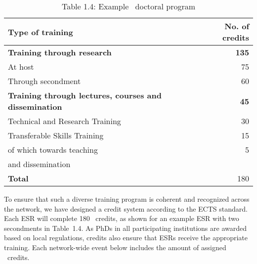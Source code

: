 \begin{wraptable}{l}{0.4\textwidth}
    \vspace{-2mm}
	\caption*{Table 1.4: Example \acronym\ doctoral program\label{tab:docProg}
	}\vspace{4mm}
	\footnotesize
	\begin{tabular}{p{45mm}r}
		\midrule
		Type of training & No. of credits \tabularnewline\midrule
		\textbf{Training through research}  & \textbf{135} \tabularnewline
		\hspace{5mm}At host & 75 \tabularnewline
		\hspace{5mm}Through secondment  & 60 \tabularnewline\midrule
		\textbf{Training through lectures, courses and dissemination} &  \textbf{45} \tabularnewline
		\hspace{5mm}Technical and Research Training & 30 \tabularnewline
		\hspace{5mm}Transferable Skills Training & 15 \tabularnewline
		\hspace{10mm}of which towards teaching & 5\tabularnewline
        \hspace{10mm}and dissemination & \tabularnewline
		\textbf{Total} &  180 \tabularnewline
		\bottomrule
	\end{tabular}
    \vspace{-2mm}
\end{wraptable}

To ensure that such a diverse training program is coherent and recognized across the network, we have designed  a \acronym credit system according to the ECTS standard. 
Each ESR will complete 180 \acronym\ credits, as shown for an example
ESR with two secondments in Table~1.4. %
As PhDs in all participating institutions are awarded based on local regulations, \acronym credits also ensure that ESRs receive the appropriate training. 
Each network-wide event below includes the amount of assigned \acronym\ credits.

